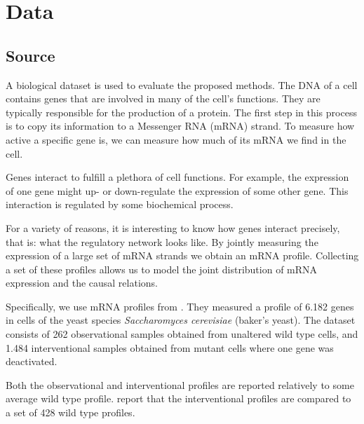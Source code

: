 \newpage
\section{Data}


\subsection{Source}

A biological dataset is used to evaluate the proposed methods. The DNA of a cell contains genes that are involved in many of the cell's functions. They are typically responsible for the production of a protein. The first step in this process is to copy its information to a Messenger RNA (mRNA) strand. To measure how active a specific gene is, we can measure how much of its mRNA we find in the cell.

Genes interact to fulfill a plethora of cell functions. For example, the expression of one gene might up- or down-regulate the expression of some other gene. This interaction is regulated by some biochemical process. 

For a variety of reasons, it is interesting to know how genes interact precisely, that is: what the regulatory network looks like. By jointly measuring the expression of a large set of mRNA strands we obtain an mRNA profile. Collecting a set of these profiles allows us to model the joint distribution of mRNA expression and the causal relations.

Specifically, we use mRNA profiles from \citet{kemmeren2014large}. They measured a profile of 6.182 genes in cells of the yeast species \textit{Saccharomyces cerevisiae} (baker's yeast). The dataset consists of 262 observational samples obtained from unaltered wild type cells, and 1.484 interventional samples obtained from mutant cells where one gene was deactivated.

Both the observational and interventional profiles are reported relatively to some average wild type profile. \citeauthor{kemmeren2014large} report that the interventional profiles are compared to a set of 428 wild type profiles.   

